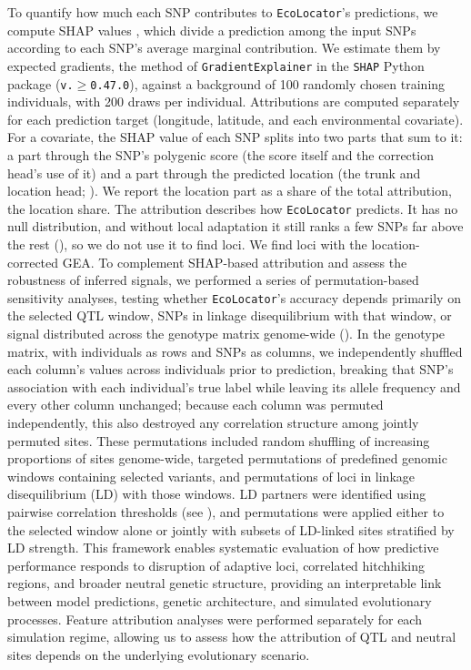 \documentclass[]{article}
\newcommand{\ecolocator}{\texttt{EcoLocator}\xspace}
\begin{document}
To quantify how much each SNP contributes to \ecolocator's predictions,
we compute SHAP values \citep{lundberg_shap_2017},
which divide a prediction among the input SNPs
according to each SNP's average marginal contribution.
We estimate them by expected gradients,
the method of \texttt{GradientExplainer} in the \texttt{SHAP} Python package
(\texttt{v.$\geq$0.47.0}),
against a background of 100 randomly chosen training individuals,
with 200 draws per individual.
Attributions are computed separately for each prediction target
(longitude, latitude, and each environmental covariate).
For a covariate, the SHAP value of each SNP splits into two parts that sum to it:
a part through the SNP's polygenic score
(the score itself and the correction head's use of it)
and a part through the predicted location
(the trunk and location head; ).
We report the location part as a share of the total attribution,
the location share.
The attribution describes how \ecolocator predicts.
It has no null distribution,
and without local adaptation it still ranks a few SNPs far above the rest
(), so we do not use it to find loci.
We find loci with the location-corrected GEA.
To complement SHAP-based attribution
and assess the robustness of inferred signals,
we performed a series of permutation-based sensitivity analyses,
testing whether \ecolocator's accuracy depends primarily on the selected QTL window, 
SNPs in linkage disequilibrium with that window, 
or signal distributed across the genotype matrix genome-wide 
().
In the genotype matrix,
with individuals as rows and SNPs as columns,
we independently shuffled each column's values across individuals prior to prediction,
breaking that SNP's association with each individual's true label
while leaving its allele frequency and every other column unchanged;
because each column was permuted independently, this also destroyed any 
correlation structure among jointly permuted sites.
These permutations included random shuffling
of increasing proportions of sites genome-wide,
targeted permutations of predefined genomic windows
containing selected variants,
and permutations of loci in linkage disequilibrium (LD)
with those windows.
LD partners were identified using pairwise correlation thresholds
(see ),
and permutations were applied either to the selected window alone
or jointly with subsets of LD-linked sites
stratified by LD strength.
This framework enables systematic evaluation
of how predictive performance responds to disruption
of adaptive loci, correlated hitchhiking regions,
and broader neutral genetic structure,
providing an interpretable link between model predictions,
genetic architecture, and simulated evolutionary processes.
Feature attribution analyses were performed separately
for each simulation regime,
allowing us to assess how the attribution of QTL and neutral sites
depends on the underlying evolutionary scenario.
\end{document}
